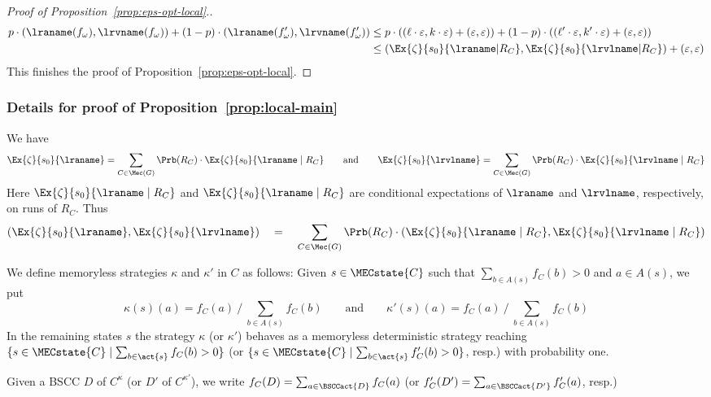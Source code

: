 \begin{proof}[Proof of Proposition~\ref{prop:eps-opt-local}.]
\begin{align*}
p\cdot (\lraname(f_{\omega}),\lrvname(f_{\omega})) +(1-p)\cdot  (\lraname(f'_{\omega}),\lrvname(f'_{\omega})) &
   \leq p\cdot \left((\ell\cdot \varepsilon,k\cdot \varepsilon)+(\varepsilon,\varepsilon)\right)+(1-p)\cdot \left((\ell'\cdot \varepsilon,k'\cdot \varepsilon)+(\varepsilon,\varepsilon)\right) \\
  & \leq  (\Ex{\zeta}{s_0}{\lraname|R_C}, \Ex{\zeta}{s_0}{\lrvlname|R_C})+(\varepsilon,\varepsilon)
\end{align*}
This finishes the proof of Proposition~\ref{prop:eps-opt-local}.
\end{proof}

\subsubsection{Details for proof of Proposition~\ref{prop:local-main}}\label{app-local-main}
We have
\[
\Ex{\zeta}{s_0}{\lraname}=\sum_{C\in \Mec(G)} \Prb(R_C)\cdot \Ex{\zeta}{s_0}{\lraname\mid R_C}
\qquad
\text{and}
\qquad
\Ex{\zeta}{s_0}{\lrvlname}=\sum_{C\in \Mec(G)} \Prb(R_C)\cdot \Ex{\zeta}{s_0}{\lrvlname\mid R_C}
\]
Here $\Ex{\zeta}{s_0}{\lraname\mid R_C}$ and $\Ex{\zeta}{s_0}{\lraname\mid R_C}$ are conditional expectations of $\lraname$ and $\lrvlname$, respectively, on runs of $R_C$.
Thus
\begin{equation}\label{eq:ev-complete}
(\Ex{\zeta}{s_0}{\lraname}, \Ex{\zeta}{s_0}{\lrvlname})\quad = \quad \sum_{C\in \Mec(G)} \Prb(R_C)\cdot \left(\Ex{\zeta}{s_0}{\lraname\mid R_C},\Ex{\zeta}{s_0}{\lrvlname\mid R_C}\right)
\end{equation}


We define memoryless strategies $\kappa$ and $\kappa'$ in $C$ as follows: Given $s\in \MECstate{C}$ such that $\sum_{b\in A(s)} f_C(b)>0$ and $a\in A(s)$, we put
\[
\kappa(s)(a)=f_C(a)\ /\ \sum_{b\in A(s)} f_C(b)
\qquad
\text{and}
\qquad
\kappa'(s)(a)=f_C(a)\ /\ \sum_{b\in A(s)} f_C(b)
\]
In the remaining states $s$ the strategy $\kappa$ (or $\kappa'$) behaves as a memoryless deterministic strategy reaching $\{s\in \MECstate{C}\mid \sum_{b\in \act{s}} f_C(b)>0\}$ (or $\{s\in \MECstate{C}\mid \sum_{b\in \act{s}} f'_C(b)>0\}$, resp.) with probability one.

Given a BSCC $D$ of $C^{\kappa}$ (or $D'$ of $C^{\kappa'}$), we write $f_C(D)=\sum_{a\in \BSCCact{D}} f_C(a)$ (or $f'_C(D')=\sum_{a\in \BSCCact{D'}} f'_C(a)$, resp.)

